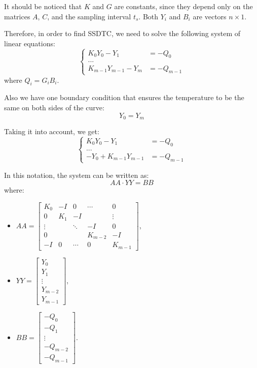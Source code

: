 It should be noticed that $K$ and $G$ are constants, since they depend only on the matrices $A$, $C$, and the sampling interval $t_s$.  Both $Y_i$ and $B_i$ are vectors $n \times 1$.

Therefore, in order to find SSDTC, we need to solve the following system of linear equations:
\[
  \begin{cases}
    K_0 Y_0 - Y_1 & = -Q_0 \\
    ... \\
    K_{m-1} Y_{m-1} - Y_{m} & = -Q_{m-1}
  \end{cases}
\]
where $Q_i = G_i B_i$.

Also we have one boundary condition that ensures the temperature to be the same on both sides of the curve:
\begin{equation} \label{eq:boundary-condition}
  Y_0 = Y_m
\end{equation}

Taking it into account, we get:
\[
  \begin{cases}
    K_0 Y_0 - Y_1 & =-Q_0 \\
    ... \\
    -Y_0 + K_{m-1} Y_{m-1} & = -Q_{m-1}
  \end{cases}
\]

In this notation, the system can be written as:
\begin{equation} \label{eq:system}
  AA \cdot YY = BB
\end{equation}
where:
\begin{itemize}
  \item
    $AA = \left[
      \begin{array}{ccccc}
        K_0 & -I & 0 & \cdots & 0 \\
        0 & K_1 & -I &  & \vdots \\
        \vdots &  & \ddots & -I & 0 \\
        0 &  &  & K_{m-2} & -I \\
        -I & 0 & \cdots & 0 & K_{m-1}
      \end{array}
    \right]$,

  \item
    $YY = \left[
      \begin{array}{c}
        Y_0 \\
        Y_1 \\
        \vdots \\
        Y_{m-2} \\
        Y_{m-1}
      \end{array}
    \right]$,

  \item $BB = \left[
    \begin{array}{c}
      -Q_0 \\
      -Q_1 \\
      \vdots \\
      -Q_{m-2} \\
      -Q_{m-1}
    \end{array}
  \right]$.
\end{itemize}

